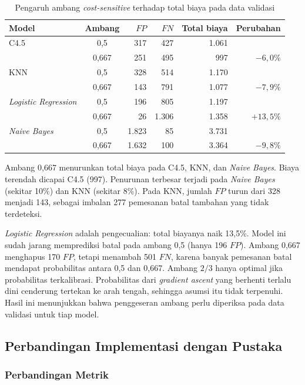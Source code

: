 \begin{table}[H]
\centering
\small
\caption{Pengaruh ambang \textit{cost-sensitive} terhadap total biaya pada data validasi}
\label{tab:cost}

\begin{tabular}{@{}lcrrrr@{}}
\toprule
Model & Ambang & $FP$ & $FN$ & Total biaya & Perubahan \\
\midrule
C4.5 & 0,5 & 317 & 427 & 1.061 & \\
 & 0,667 & 251 & 495 & 997 & $-6{,}0\%$ \\
KNN & 0,5 & 328 & 514 & 1.170 & \\
 & 0,667 & 143 & 791 & 1.077 & $-7{,}9\%$ \\
\textit{Logistic Regression} & 0,5 & 196 & 805 & 1.197 & \\
 & 0,667 & 26 & 1.306 & 1.358 & $+13{,}5\%$ \\
\textit{Naive Bayes} & 0,5 & 1.823 & 85 & 3.731 & \\
 & 0,667 & 1.632 & 100 & 3.364 & $-9{,}8\%$ \\
\bottomrule
\end{tabular}
\end{table}

Ambang 0,667 menurunkan total biaya pada C4.5, KNN, dan \textit{Naive
Bayes}. Biaya terendah dicapai C4.5 (997). Penurunan terbesar terjadi pada
\textit{Naive Bayes} (sekitar 10\%) dan KNN (sekitar 8\%). Pada KNN, jumlah
$FP$ turun dari 328 menjadi 143, sebagai imbalan 277 pemesanan batal
tambahan yang tidak terdeteksi.

\textit{Logistic Regression} adalah pengecualian: total biayanya naik
13,5\%. Model ini sudah jarang memprediksi batal pada ambang 0,5 (hanya 196
$FP$). Ambang 0,667 menghapus 170 $FP$, tetapi menambah 501 $FN$, karena
banyak pemesanan batal mendapat probabilitas antara 0,5 dan 0,667. Ambang
$2/3$ hanya optimal jika probabilitas terkalibrasi. Probabilitas dari
\textit{gradient ascent} yang berhenti terlalu dini cenderung tertekan ke
arah tengah, sehingga asumsi itu tidak terpenuhi. Hasil ini menunjukkan
bahwa penggeseran ambang perlu diperiksa pada data validasi untuk tiap model.

\subsection{Perbandingan Implementasi dengan Pustaka}

\subsubsection{Perbandingan Metrik}

